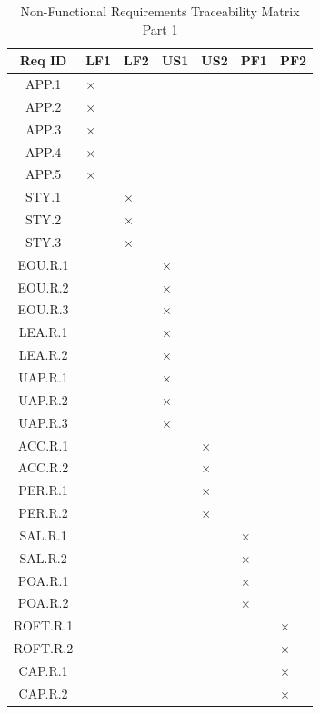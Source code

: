 \documentclass[12pt, titlepage]{article}
\begin{document}
\begin{table}[H]
\centering
\small
\caption{Non-Functional Requirements Traceability Matrix Part 1}
\label{tab:nfr-trace-a}
\begin{tabularx}{\textwidth}{|c|*{6}{>{\centering\arraybackslash}X|}}
\hline
Req ID & LF1 & LF2 & US1 & US2 & PF1 & PF2 \\
\hline
APP.1 & $\times$ & & & & & \\
\hline
APP.2 & $\times$ & & & & & \\
\hline
APP.3 & $\times$ & & & & & \\
\hline
APP.4 & $\times$ & & & & & \\
\hline
APP.5 & $\times$ & & & & & \\
\hline
STY.1 & & $\times$ & & & & \\
\hline
STY.2 & & $\times$ & & & & \\
\hline
STY.3 & & $\times$ & & & & \\
\hline
EOU.R.1 & & & $\times$ & & & \\
\hline
EOU.R.2 & & & $\times$ & & & \\
\hline
EOU.R.3 & & & $\times$ & & & \\
\hline
LEA.R.1 & & & $\times$ & & & \\
\hline
LEA.R.2 & & & $\times$ & & & \\
\hline
UAP.R.1 & & & $\times$ & & & \\
\hline
UAP.R.2 & & & $\times$ & & & \\
\hline
UAP.R.3 & & & $\times$ & & & \\
\hline
ACC.R.1 & & & & $\times$ & & \\
\hline
ACC.R.2 & & & & $\times$ & & \\
\hline
PER.R.1 & & & & $\times$ & & \\
\hline
PER.R.2 & & & & $\times$ & & \\
\hline
SAL.R.1 & & & & & $\times$ & \\
\hline
SAL.R.2 & & & & & $\times$ & \\
\hline
POA.R.1 & & & & & $\times$ & \\
\hline
POA.R.2 & & & & & $\times$ & \\
\hline
ROFT.R.1 & & & & & & $\times$ \\
\hline
ROFT.R.2 & & & & & & $\times$ \\
\hline
CAP.R.1 & & & & & & $\times$ \\
\hline
CAP.R.2 & & & & & & $\times$ \\
\hline
\end{tabularx}
\end{table}
\FloatBarrier
\end{document}

